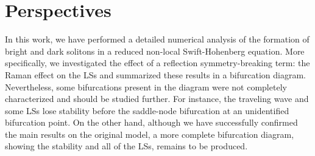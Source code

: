 \section{Perspectives}

In this work, we have performed a detailed numerical analysis of the formation
of bright and dark solitons in a reduced non-local Swift-Hohenberg equation. More specifically,
we investigated the effect of a reflection symmetry-breaking term: the Raman effect on 
the LSs and summarized these results in a bifurcation diagram. Nevertheless, some bifurcations
present in the diagram were not completely characterized and should be studied further. 
For instance, the traveling 
wave and some LSs lose stability before the saddle-node bifurcation at an unidentified
bifurcation point. On the other hand, although we have successfully confirmed the main results
on the original model, a more complete bifurcation diagram, showing the stability and all of the LSs, 
remains
to be produced.
